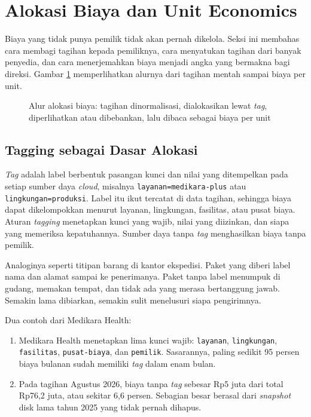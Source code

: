 \section{Alokasi Biaya dan Unit Economics}
\label{sec:ch03-alokasi}

Biaya yang tidak punya pemilik tidak akan pernah dikelola. Seksi ini membahas cara membagi tagihan
kepada pemiliknya, cara menyatukan tagihan dari banyak penyedia, dan cara menerjemahkan biaya
menjadi angka yang bermakna bagi direksi. Gambar \ref{fig:ch03-alur-alokasi} memperlihatkan alurnya
dari tagihan mentah sampai biaya per unit.

\begin{figure}[!htb]
  \centering
  
  \caption{Alur alokasi biaya: tagihan dinormalisasi, dialokasikan lewat
           \textit{tag}, diperlihatkan atau dibebankan, lalu dibaca sebagai
           biaya per unit}
  \label{fig:ch03-alur-alokasi}
\end{figure}

\subsection{Tagging sebagai Dasar Alokasi}

\textit{Tag} adalah label berbentuk pasangan kunci dan nilai yang ditempelkan pada setiap sumber
daya \textit{cloud}, misalnya \texttt{layanan=medikara-plus} atau \texttt{lingkungan=produksi}.
Label itu ikut tercatat di data tagihan, sehingga biaya dapat dikelompokkan menurut layanan,
lingkungan, fasilitas, atau pusat biaya. Aturan \textit{tagging} menetapkan kunci yang wajib, nilai
yang diizinkan, dan siapa yang memeriksa kepatuhannya. Sumber daya tanpa \textit{tag} menghasilkan
biaya tanpa pemilik.

Analoginya seperti titipan barang di kantor ekspedisi. Paket yang diberi label nama dan alamat
sampai ke penerimanya. Paket tanpa label menumpuk di gudang, memakan tempat, dan tidak ada yang
merasa bertanggung jawab. Semakin lama dibiarkan, semakin sulit menelusuri siapa pengirimnya.

Dua contoh dari Medikara Health:
\begin{enumerate}
  \item Medikara Health menetapkan lima kunci wajib: \texttt{layanan}, \texttt{lingkungan},
        \texttt{fasilitas}, \texttt{pusat-biaya}, dan \texttt{pemilik}. Sasarannya, paling sedikit
        95 persen biaya bulanan sudah memiliki \textit{tag} dalam enam bulan.
  \item Pada tagihan Agustus 2026, biaya tanpa \textit{tag} sebesar Rp5 juta dari total Rp76,2 juta,
        atau sekitar 6,6 persen. Sebagian besar berasal dari \textit{snapshot} disk lama tahun 2025
        yang tidak pernah dihapus.
\end{enumerate}

